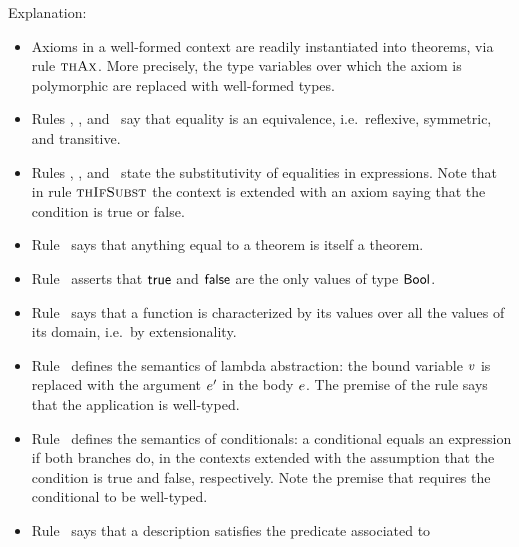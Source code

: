Explanation:
\begin{itemize}
\item
Axioms in a well-formed context are readily instantiated into theorems, via
rule $\textsc{thAx}$. More precisely, the type variables over which the axiom is
polymorphic are replaced with well-formed types.
\item
Rules \Rthrefl, \Rthsymm, and \Rthtrans\ say that equality is an
equivalence, i.e.\ reflexive, symmetric, and transitive.
\item
Rules \Rthappsbs, \Rtheqsbs, and \Rthifsbs\ state the substitutivity of
equalities in expressions. Note that in rule $\textsc{thIfSubst}$ the context is
extended with an axiom saying that the condition is true or false.
\item
Rule \Rthsbs\ says that anything equal to a theorem is itself a theorem.
\item
Rule \Rthbool\ asserts that $\mathsf{true}$ and $\mathsf{false}$ are the only values of type
$\mathsf{Bool}$.
\item
Rule \Rthext\ says that a function is characterized by its values over all
the values of its domain, i.e.\ by extensionality.
\item
Rule \Rthabs\ defines the semantics of lambda abstraction: the bound variable
$v$ is replaced with the argument $e'$ in the body $e$. The premise
of the rule says that the application is well-typed.
\item
Rule \Rthif\ defines the semantics of conditionals: a conditional equals an
expression if both branches do, in the contexts extended with the assumption
that the condition is true and false, respectively. Note the premise that
requires the conditional to be well-typed.
\item
Rule \Rthdesc\ says that a description satisfies the predicate associated to

\end{itemize}
